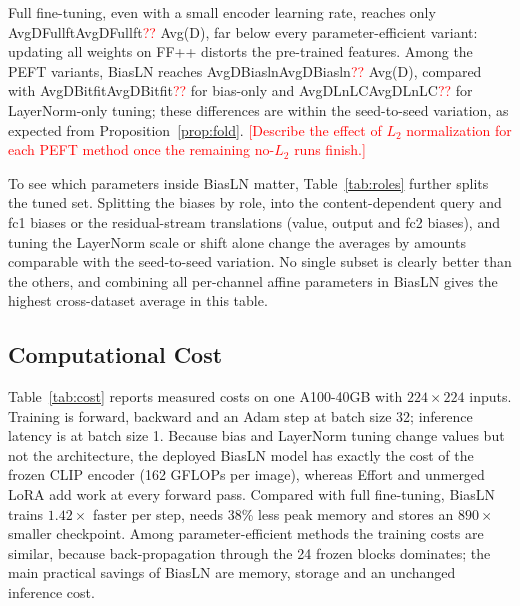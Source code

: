 \documentclass[fonts]{icst}
\newif\ifrevmark\revmarkfalse
\newcommand{\rev}[1]{\ifrevmark{\color{revblue}#1}\else#1\fi}
\newenvironment{revblock}{\ifrevmark\color{revblue}\fi}{}
\newif\ifpending\pendingtrue
\newcommand{\pending}[1]{\ifpending\textcolor{red}{[#1]}\else\errmessage{pending text left: #1}\fi}
\newcommand{\num}[1]{\ifcsname #1\endcsname\csname #1\endcsname\else\textcolor{red}{??}\fi}
\begin{document}
\begin{revblock}
Full fine-tuning, even with a small encoder learning rate, reaches only \num{AvgDFullft} Avg(D), far below every parameter-efficient variant: updating all weights on FF++ distorts the pre-trained features. Among the PEFT variants, BiasLN reaches \num{AvgDBiasln} Avg(D), compared with \num{AvgDBitfit} for bias-only and \num{AvgDLnLC} for LayerNorm-only tuning; these differences are within the seed-to-seed variation, as expected from Proposition~\ref{prop:fold}. \pending{Describe the effect of $L_2$ normalization for each PEFT method once the remaining no-$L_2$ runs finish.}

To see which parameters inside BiasLN matter, Table~\ref{tab:roles} further splits the tuned set. Splitting the biases by role, into the content-dependent query and fc1 biases or the residual-stream translations (value, output and fc2 biases), and tuning the LayerNorm scale or shift alone change the averages by amounts comparable with the seed-to-seed variation. No single subset is clearly better than the others, and combining all per-channel affine parameters in BiasLN gives the highest cross-dataset average in this table.
\end{revblock}

\begin{table}[H]
\centering
\captionsetup{labelsep=period, labelfont=bf, hypcap=false}
\caption{\rev{Which parameters inside BiasLN to tune ($L_2$ normalization, cross-entropy). Only the tuned subset of the encoder differs. Video AUC, mean $\pm$ std over $n$ seeds.}}
\label{tab:roles}
\resizebox{\columnwidth}{!}{}
\end{table}

\begin{revblock}
\subsection{Computational Cost}
\label{sec:cost}
Table~\ref{tab:cost} reports measured costs on one A100-40GB with $224\times224$ inputs. Training is forward, backward and an Adam step at batch size 32; inference latency is at batch size 1. Because bias and LayerNorm tuning change values but not the architecture, the deployed BiasLN model has exactly the cost of the frozen CLIP encoder (162 GFLOPs per image), whereas Effort and unmerged LoRA add work at every forward pass. Compared with full fine-tuning, BiasLN trains $1.42\times$ faster per step, needs 38\% less peak memory and stores an $890\times$ smaller checkpoint. Among parameter-efficient methods the training costs are similar, because back-propagation through the 24 frozen blocks dominates; the main practical savings of BiasLN are memory, storage and an unchanged inference cost.
\end{revblock}
\end{document}
